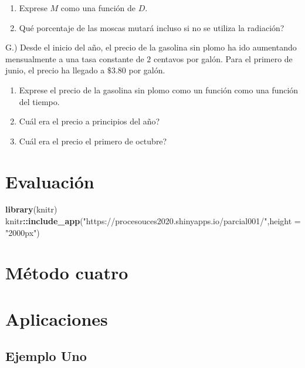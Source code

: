 \documentclass[]{book}
\newenvironment{Shaded}{\begin{snugshade}}{\end{snugshade}}
\newcommand{\DataTypeTok}[1]{\textcolor[rgb]{0.13,0.29,0.53}{#1}}
\newcommand{\KeywordTok}[1]{\textcolor[rgb]{0.13,0.29,0.53}{\textbf{#1}}}
\newcommand{\NormalTok}[1]{#1}
\newcommand{\OperatorTok}[1]{\textcolor[rgb]{0.81,0.36,0.00}{\textbf{#1}}}
\newcommand{\StringTok}[1]{\textcolor[rgb]{0.31,0.60,0.02}{#1}}
\providecommand{\tightlist}{%
  \setlength{\itemsep}{0pt}\setlength{\parskip}{0pt}}
\theoremstyle{definition}
\theoremstyle{definition}
\theoremstyle{definition}
\theoremstyle{remark}
\begin{document}
\begin{enumerate}
\def\labelenumi{\alph{enumi}.}
\tightlist
\item
  Exprese \(M\) como una función de \(D\).
\item
  Qué porcentaje de las moscas mutará incluso si no se utiliza la radiación?
\end{enumerate}

G.) Desde el inicio del año, el precio de la gasolina sin plomo ha ido aumentando mensualmente a una tasa constante de \(2\) centavos por galón. Para el primero de junio, el precio ha llegado a \(\$ 3.80\) por galón.

\begin{enumerate}
\def\labelenumi{\alph{enumi}.}
\tightlist
\item
  Exprese el precio de la gasolina sin plomo como un función como una función del tiempo.
\item
  Cuál era el precio a principios del año?
\item
  Cuál era el precio el primero de octubre?
\end{enumerate}

\hypertarget{evaluaciuxf3n}{%
\chapter{Evaluación}\label{evaluaciuxf3n}}

\begin{Shaded}
\begin{Highlighting}[]
\KeywordTok{library}\NormalTok{(knitr)}
\NormalTok{knitr}\OperatorTok{::}\KeywordTok{include_app}\NormalTok{(}\StringTok{"https://procesouces2020.shinyapps.io/parcial001/"}\NormalTok{,}\DataTypeTok{height =} \StringTok{"2000px"}\NormalTok{)}
\end{Highlighting}
\end{Shaded}

\hypertarget{muxe9todo-cuatro}{%
\chapter{Método cuatro}\label{muxe9todo-cuatro}}

\hypertarget{aplicaciones}{%
\chapter{Aplicaciones}\label{aplicaciones}}

\hypertarget{ejemplo-uno}{%
\section{Ejemplo Uno}\label{ejemplo-uno}}
\end{document}

